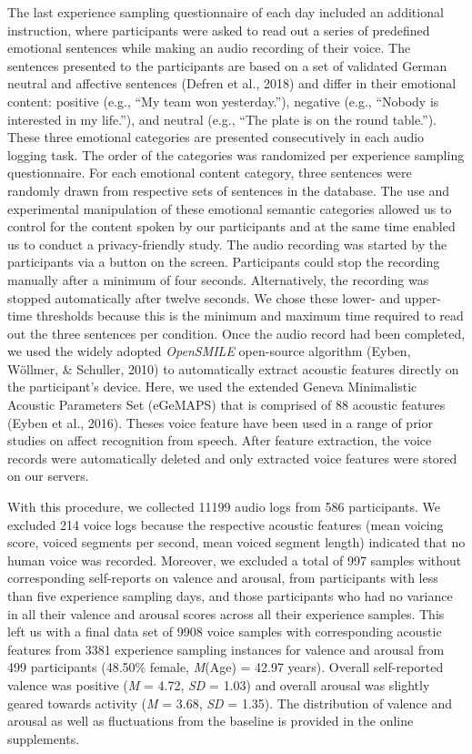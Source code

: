 \documentclass[
  man,floatsintext]{apa6}
\begin{document}
The last experience sampling questionnaire of each day included an additional instruction, where participants were asked to read out a series of predefined emotional sentences while making an audio recording of their voice. The sentences presented to the participants are based on a set of validated German neutral and affective sentences (Defren et al., 2018) and differ in their emotional content: positive (e.g., ``My team won yesterday.''), negative (e.g., ``Nobody is interested in my life.''), and neutral (e.g., ``The plate is on the round table.''). These three emotional categories are presented consecutively in each audio logging task. The order of the categories was randomized per experience sampling questionnaire. For each emotional content category, three sentences were randomly drawn from respective sets of sentences in the database. The use and experimental manipulation of these emotional semantic categories allowed us to control for the content spoken by our participants and at the same time enabled us to conduct a privacy-friendly study. The audio recording was started by the participants via a button on the screen. Participants could stop the recording manually after a minimum of four seconds. Alternatively, the recording was stopped automatically after twelve seconds. We chose these lower- and upper-time thresholds because this is the minimum and maximum time required to read out the three sentences per condition.
Once the audio record had been completed, we used the widely adopted \emph{OpenSMILE} open-source algorithm (Eyben, Wöllmer, \& Schuller, 2010) to automatically extract acoustic features directly on the participant's device. Here, we used the extended Geneva Minimalistic Acoustic Parameters Set (eGeMAPS) that is comprised of 88 acoustic features (Eyben et al., 2016). Theses voice feature have been used in a range of prior studies on affect recognition from speech. After feature extraction, the voice records were automatically deleted and only extracted voice features were stored on our servers.

With this procedure, we collected 11199 audio logs from 586 participants. We excluded 214 voice logs because the respective acoustic features (mean voicing score, voiced segments per second, mean voiced segment length) indicated that no human voice was recorded. Moreover, we excluded a total of 997 samples without corresponding self-reports on valence and arousal, from participants with less than five experience sampling days, and those participants who had no variance in all their valence and arousal scores across all their experience samples.
This left us with a final data set of 9908 voice samples with corresponding acoustic features from 3381 experience sampling instances for valence and arousal from 499 participants (48.50\% female, \emph{M}(Age) = 42.97 years). Overall self-reported valence was positive (\emph{M} = 4.72, \emph{SD} = 1.03) and overall arousal was slightly geared towards activity (\emph{M} = 3.68, \emph{SD} = 1.35). The distribution of valence and arousal as well as fluctuations from the baseline is provided in the online supplements.
\end{document}
